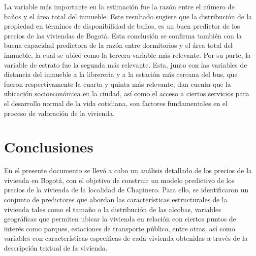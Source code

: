\documentclass[a4paper]{article}
\theoremstyle{remark}
\theoremstyle{definition}
\begin{document}
La variable más importante en la estimación fue la razón entre el número de baños y el área total del inmueble. Este resultado sugiere que la distribución de la propiedad en términos de disponibilidad de baños, es un buen predictor de los precios de las viviendas de Bogotá. Esta conclusión se confirma también con la buena capacidad predictora de la razón entre dormitorios y el área total del inmueble, la cual se ubicó como la tercera variable más relevante. Por su parte, la variable de estrato fue la segunda más relevante. Esta, junto con las variables de distancia del inmueble a la librereria y a la estación más cercana del bus, que fueron respectivamente la cuarta y quinta más relevante, dan cuenta que la ubicación socioeconómica en la ciudad, así como el acceso a ciertos servicios para el desarrollo normal de la vida cotidiana, son factores fundamentales en el proceso de valoración de la vivienda. 

\section{Conclusiones}

En el presente documento se llevó a cabo un análisis detallado de los precios de la vivienda en Bogotá, con el objetivo de construir un modelo predictivo de los precios de la vivienda de la localidad de Chapinero. Para ello, se identificaron un conjunto de predictores que abordan las características estructurales de la vivienda tales como el tamaño o la distribución de las alcobas, variables geográficas que permiten ubicar la vivienda en relación con ciertos puntos de interés como parques, estaciones de transporte público, entre otras, así como variables con características específicas de cada vivienda obtenidas a través de la descripción textual de la vivienda. \\
\end{document}
